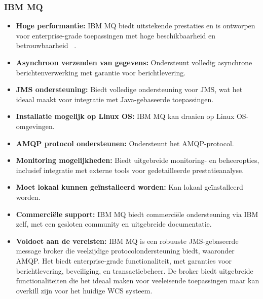 \subsubsection{IBM MQ}
\begin{itemize}
    \item \textbf{Hoge performantie:} IBM MQ biedt uitstekende prestaties en is ontworpen voor enterprise-grade toepassingen met hoge beschikbaarheid en betrouwbaarheid ~\autocite{IBM2024}.
    \item \textbf{Asynchroon verzenden van gegevens:} Ondersteunt volledig asynchrone berichtenverwerking met garantie voor berichtlevering.
    \item \textbf{JMS ondersteuning:} Biedt volledige ondersteuning voor JMS, wat het ideaal maakt voor integratie met Java-gebaseerde toepassingen.
    \item \textbf{Installatie mogelijk op Linux OS:} IBM MQ kan draaien op Linux OS-omgevingen.
    \item \textbf{AMQP protocol ondersteunen:} Ondersteunt het AMQP-protocol.
    \item \textbf{Monitoring mogelijkheden:} Biedt uitgebreide monitoring- en beheeropties, inclusief integratie met externe tools voor gedetailleerde prestatieanalyse.
    \item \textbf{Moet lokaal kunnen geïnstalleerd worden:} Kan lokaal geïnstalleerd worden.
    \item \textbf{Commerciële support:} IBM MQ biedt commerciële ondersteuning via IBM zelf, met een gesloten community en uitgebreide documentatie.
    \item \textbf{Voldoet aan de vereisten:} IBM MQ is een robuuste JMS-gebaseerde message broker die veelzijdige protocolondersteuning biedt, waaronder AMQP. 
    Het biedt enterprise-grade functionaliteit, met garanties voor berichtlevering, beveiliging, en transactiebeheer. 
    De broker biedt uitgebreide functionaliteiten die het ideaal maken voor veeleisende toepassingen maar kan overkill zijn voor het huidige WCS systeem.
\end{itemize}
 

